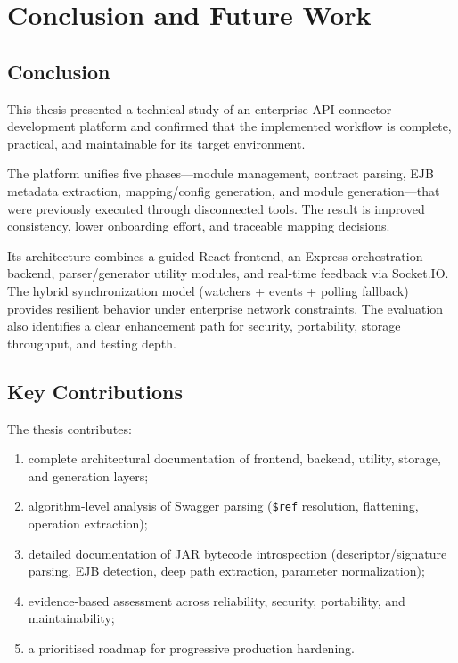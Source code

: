 \chapter{Conclusion and Future Work}

\section{Conclusion}

This thesis presented a technical study of an enterprise API connector development platform and confirmed that the implemented workflow is complete, practical, and maintainable for its target environment.

The platform unifies five phases---module management, contract parsing, EJB metadata extraction, mapping/config generation, and module generation---that were previously executed through disconnected tools. The result is improved consistency, lower onboarding effort, and traceable mapping decisions.

Its architecture combines a guided React frontend, an Express orchestration backend, parser/generator utility modules, and real-time feedback via Socket.IO. The hybrid synchronization model (watchers + events + polling fallback) provides resilient behavior under enterprise network constraints. The evaluation also identifies a clear enhancement path for security, portability, storage throughput, and testing depth.

\section{Key Contributions}

The thesis contributes:
\begin{enumerate}
    \item complete architectural documentation of frontend, backend, utility, storage, and generation layers;
    \item algorithm-level analysis of Swagger parsing (\texttt{\$ref} resolution, flattening, operation extraction);
    \item detailed documentation of JAR bytecode introspection (descriptor/signature parsing, EJB detection, deep path extraction, parameter normalization);
    \item evidence-based assessment across reliability, security, portability, and maintainability;
    \item a prioritised roadmap for progressive production hardening.
\end{enumerate}

